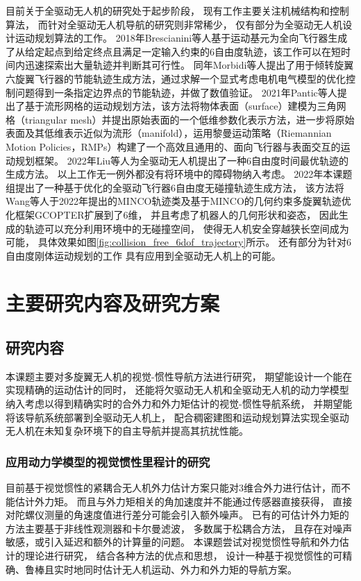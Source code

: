 目前关于全驱动无人机的研究处于起步阶段，
现有工作主要关注机械结构和控制算法，
而针对全驱动无人机导航的研究则非常稀少，
仅有部分为全驱动无人机设计运动规划算法的工作。
2018年Brescianini等人基于运动基元为全向飞行器生成了从给定起点到给定终点且满足一定输入约束的6自由度轨迹\cite{brescianini2018computationally}，该工作可以在短时间内迅速探索出大量轨迹并判断其可行性。
同年Morbidi等人提出了用于倾转旋翼六旋翼飞行器的节能轨迹生成方法\cite{morbidi2018energy}，通过求解一个显式考虑电机电气模型的优化控制问题得到一条指定边界点的节能轨迹，并做了数值验证。
2021年Pantic等人提出了基于流形网格的运动规划方法\cite{pantic2021mesh}，该方法将物体表面（surface）建模为三角网格（triangular mesh）并提出原始表面的一个低维参数化表示方法，进一步将原始表面及其低维表示近似为流形（manifold），运用黎曼运动策略（Riemannian Motion Policies，RMPs）构建了一个高效且通用的、面向飞行器与表面交互的运动规划框架。
2022年Liu等人为全驱动无人机提出了一种6自由度时间最优轨迹的生成方法\cite{liu2022optimal}。
以上工作无一例外都没有将环境中的障碍物纳入考虑。
2022年本课题组提出了一种基于优化的全驱动飞行器6自由度无碰撞轨迹生成方法\cite{liu2022collision}，
该方法将Wang等人于2022年提出的MINCO轨迹类及基于MINCO的几何约束多旋翼轨迹优化框架GCOPTER\cite{wang2022geometrically}扩展到了6维，
并且考虑了机器人的几何形状和姿态，
因此生成的轨迹可以充分利用环境中的无碰撞空间，
使得无人机安全穿越狭长空间成为可能，
具体效果如图\ref{fig:collision_free_6dof_trajectory}所示。
还有部分为针对6自由度刚体运动规划的工作
\cite{nguyen2016time, belta2002svd, belta2002euclidean, bestaoui2003motion, zefran1998generation, watterson2016smooth, jackson2021planning}
具有应用到全驱动无人机上的可能。

\section{主要研究内容及研究方案}
\subsection{研究内容}
本课题主要对多旋翼无人机的视觉-惯性导航方法进行研究，
期望能设计一个能在实现精确的运动估计的同时，
还能将欠驱动无人机和全驱动无人机的动力学模型纳入考虑以得到精确实时的合外力和外力矩估计的视觉-惯性导航系统，
并期望能将该导航系统部署到全驱动无人机上，
配合稠密建图和运动规划算法实现全驱动无人机在未知复杂环境下的自主导航并提高其抗扰性能。

\subsubsection{应用动力学模型的视觉惯性里程计的研究}
目前基于视觉惯性的紧耦合无人机外力估计方案只能对3维合外力进行估计，而不能估计外力矩。
而且与外力矩相关的角加速度并不能通过传感器直接获得，
直接对陀螺仪测量的角速度值进行差分可能会引入额外噪声\cite{邱国鹏2023应用视觉}。
已有的可估计外力矩的方法主要基于非线性观测器和卡尔曼滤波，
多数属于松耦合方法，
且存在对噪声敏感，或引入延迟和额外的计算量的问题。
本课题尝试对视觉惯性导航和外力估计的理论进行研究，
结合各种方法的优点和思想，
设计一种基于视觉惯性的可精确、鲁棒且实时地同时估计无人机运动、外力和外力矩的导航方案。

